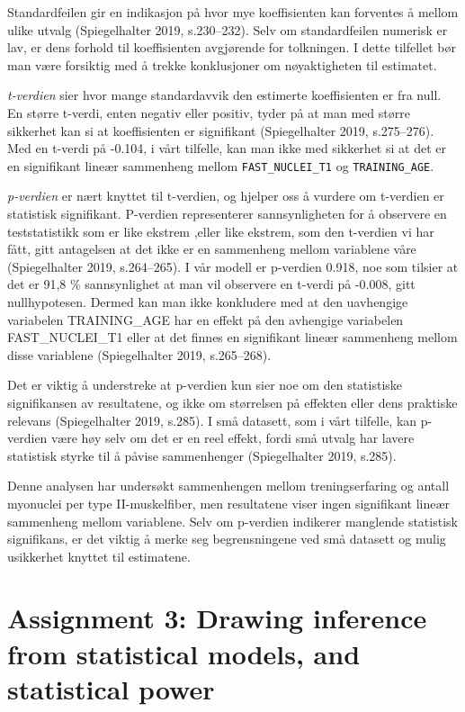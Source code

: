 \documentclass[
  letterpaper,
  DIV=11,
  numbers=noendperiod]{scrreprt}
\begin{document}
Standardfeilen gir en indikasjon på hvor mye koeffisienten kan forventes
å mellom ulike utvalg (Spiegelhalter 2019, s.230--232). Selv om
standardfeilen numerisk er lav, er dens forhold til koeffisienten
avgjørende for tolkningen. I dette tilfellet bør man være forsiktig med
å trekke konklusjoner om nøyaktigheten til estimatet.

\emph{t-verdien} sier hvor mange standardavvik den estimerte
koeffisienten er fra null. En større t-verdi, enten negativ eller
positiv, tyder på at man med større sikkerhet kan si at koeffisienten er
signifikant (Spiegelhalter 2019, s.275--276). Med en t-verdi på -0.104,
i vårt tilfelle, kan man ikke med sikkerhet si at det er en signifikant
lineær sammenheng mellom \texttt{FAST\_NUCLEI\_T1} og
\texttt{TRAINING\_AGE}.

\emph{p-verdien} er nært knyttet til t-verdien, og hjelper oss å vurdere
om t-verdien er statistisk signifikant. P-verdien representerer
sannsynligheten for å observere en teststatistikk som er like ekstrem
,eller like ekstrem, som den t-verdien vi har fått, gitt antagelsen at
det ikke er en sammenheng mellom variablene våre (Spiegelhalter 2019,
s.264--265). I vår modell er p-verdien 0.918, noe som tilsier at det er
91,8 \% sannsynlighet at man vil observere en t-verdi på -0.008, gitt
nullhypotesen. Dermed kan man ikke konkludere med at den uavhengige
variabelen TRAINING\_AGE har en effekt på den avhengige variabelen
FAST\_NUCLEI\_T1 eller at det finnes en signifikant lineær sammenheng
mellom disse variablene (Spiegelhalter 2019, s.265--268).

Det er viktig å understreke at p-verdien kun sier noe om den statistiske
signifikansen av resultatene, og ikke om størrelsen på effekten eller
dens praktiske relevans (Spiegelhalter 2019, s.285). I små datasett, som
i vårt tilfelle, kan p-verdien være høy selv om det er en reel effekt,
fordi små utvalg har lavere statistisk styrke til å påvise sammenhenger
(Spiegelhalter 2019, s.285).

Denne analysen har undersøkt sammenhengen mellom treningserfaring og
antall myonuclei per type II-muskelfiber, men resultatene viser ingen
signifikant lineær sammenheng mellom variablene. Selv om p-verdien
indikerer manglende statistisk signifikans, er det viktig å merke seg
begrensningene ved små datasett og mulig usikkerhet knyttet til
estimatene.


\chapter{Assignment 3: Drawing inference from statistical models, and
statistical
power}\label{assignment-3-drawing-inference-from-statistical-models-and-statistical-power}
\end{document}
